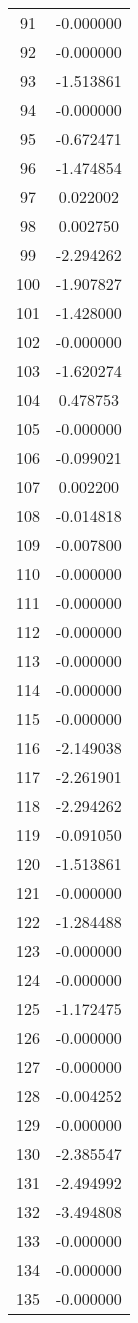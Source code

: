\documentclass[12pt]{article}
\begin{document}
\begin{longtable}{@{}cc@{}}
91 & -0.000000 \\
92 & -0.000000 \\
93 & -1.513861 \\
94 & -0.000000 \\
95 & -0.672471 \\
96 & -1.474854 \\
97 & 0.022002 \\
98 & 0.002750 \\
99 & -2.294262 \\
100 & -1.907827 \\
101 & -1.428000 \\
102 & -0.000000 \\
103 & -1.620274 \\
104 & 0.478753 \\
105 & -0.000000 \\
106 & -0.099021 \\
107 & 0.002200 \\
108 & -0.014818 \\
109 & -0.007800 \\
110 & -0.000000 \\
111 & -0.000000 \\
112 & -0.000000 \\
113 & -0.000000 \\
114 & -0.000000 \\
115 & -0.000000 \\
116 & -2.149038 \\
117 & -2.261901 \\
118 & -2.294262 \\
119 & -0.091050 \\
120 & -1.513861 \\
121 & -0.000000 \\
122 & -1.284488 \\
123 & -0.000000 \\
124 & -0.000000 \\
125 & -1.172475 \\
126 & -0.000000 \\
127 & -0.000000 \\
128 & -0.004252 \\
129 & -0.000000 \\
130 & -2.385547 \\
131 & -2.494992 \\
132 & -3.494808 \\
133 & -0.000000 \\
134 & -0.000000 \\
135 & -0.000000 \\

\end{longtable}
\end{document}
